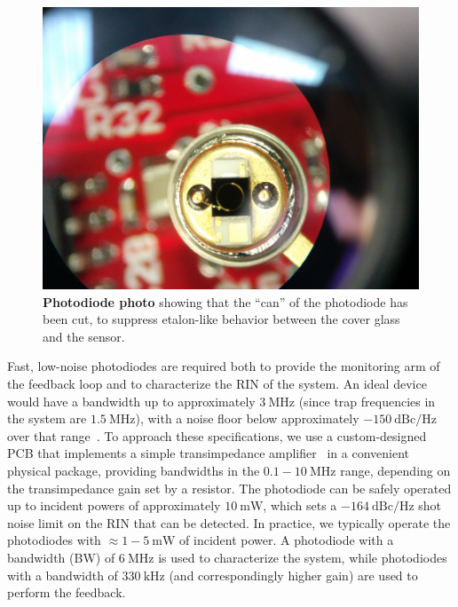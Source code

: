 \documentclass[twocolumn,aip,rsi,reprint,bibnotes]{revtex4-1}
\newcommand\unit[2]{\ensuremath{#1~\mathrm{{#2}}}}
\begin{document}
\begin{figure}
  \begin{center}
    \includegraphics[width=\columnwidth]{Figure8.jpg}
    \caption{\textbf{Photodiode photo} showing that the ``can'' of the photodiode has been cut, to suppress etalon-like behavior between the cover glass and the sensor.}\label{fig:cut_pd}
  \end{center}
\end{figure}

Fast, low-noise photodiodes are required both to provide the monitoring arm of the feedback loop and to characterize the RIN of the system.
An ideal device would have a bandwidth up to approximately \unit{3}{MHz} (since trap frequencies in the system are \unit{1.5}{MHz}), with a noise floor below approximately \unit{-150}{dBc/Hz} over that range~\cite{Blatt2015}.
To approach these specifications, we use a custom-designed PCB that implements a simple transimpedance amplifier~\cite{Graeme1995} in a convenient physical package, providing bandwidths in the \unit{0.1-10}{MHz} range, depending on the transimpedance gain set by a resistor.
The photodiode can be safely operated up to incident powers of approximately \unit{10}{mW}, which sets a \unit{-164}{dBc/Hz} shot noise limit on the RIN that can be detected.
In practice, we typically operate the photodiodes with $\approx$\unit{1-5}{mW} of incident power.
A photodiode with a bandwidth (BW) of \unit{6}{MHz} is used to characterize the system, while photodiodes with a bandwidth of \unit{330}{kHz} (and correspondingly higher gain) are used to perform the feedback.
\end{document}
